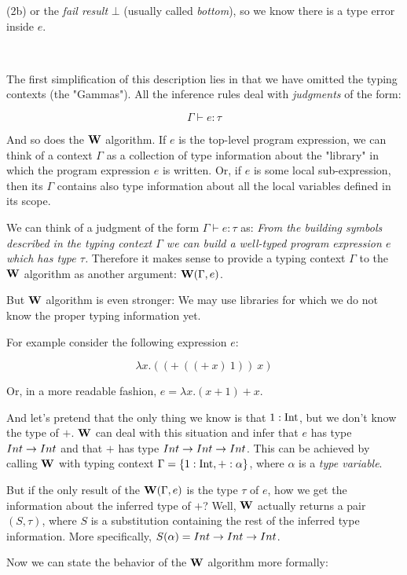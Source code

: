 \documentclass[a4paper,oneside]{memoir}
\begin{document}
(2b) or the \textit{fail result} $\bot$ (usually called \textit{bottom}), so we know there is a type error inside $e$.

~   

The first simplification of this description lies in that we have omitted 
the typing contexts (the "Gammas"). 
All the inference rules deal with \textit{judgments} of the form:

$$\Gamma \vdash e : \tau$$

And so does the $\operatorname{\textbf{W}}$ algorithm.
If $e$ is the top-level program expression,
we can think of a context $\Gamma$ as a collection of type information about the "library"
in which the program expression $e$ is written.
Or, if $e$ is some local sub-expression, then its $\Gamma$ contains also type information about
all the local variables defined in its scope.

We can think of a judgment of the form $\Gamma \vdash e : \tau$ as: 
\textit{From the building symbols described in the typing context $\Gamma$ we can build 
a well-typed program expression $e$ which has type $\tau$.}
Therefore it makes sense to provide a typing context $\Gamma$ to the $\operatorname{\textbf{W}}$ algorithm as another argument: $\operatorname{\textbf{W}}(\Gamma, e)$.

But $\operatorname{\textbf{W}}$ algorithm is even stronger: We may use libraries for which we do not know the proper typing information yet.

For example consider the following expression $e$:

$$ \lambda x . ((+~((+~x)~1))~x) $$

Or, in a more readable fashion, $e = \lambda x . (x+1)+x $.


And let's pretend that the only thing we know is that $1 : \operatorname{Int}$, 
but we don't know the type of $+$. 
$\operatorname{\textbf{W}}$ can deal with this situation and infer that $e$ has type $Int \rightarrow Int$ and
that $+$ has type $Int \rightarrow Int \rightarrow Int$. This can be achieved by calling $\operatorname{\textbf{W}}$ with
typing context $\Gamma = \{ 1 : \operatorname{Int}, + : \alpha \}$, 
where $\alpha$ is a \textit{type variable}.

But if the only result of the $\operatorname{\textbf{W}}(\Gamma,e)$ is the type $\tau$ of $e$, 
how we get the information about the inferred type of $+$? 
Well, $\operatorname{\textbf{W}}$ actually returns a pair $(S, \tau)$, where $S$ is a substitution
containing the rest of the inferred type information. 
More specifically, $S(\alpha) = Int \rightarrow Int \rightarrow Int$.  

Now we can state the behavior of the $\operatorname{\textbf{W}}$ algorithm more formally:

~
\end{document}
